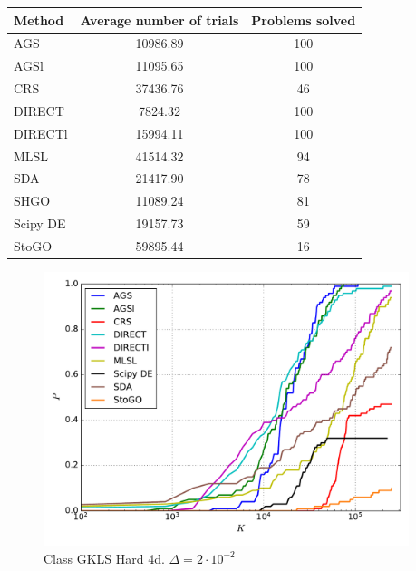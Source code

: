\documentclass[a4paper]{article}
\begin{document}
\begin{tabular}{lcc}
\hline
 Method   &  Average number of trials  &  Problems solved  \\
\hline
 AGS      &          10986.89          &        100        \\
 AGSl     &          11095.65          &        100        \\
 CRS      &          37436.76          &        46         \\
 DIRECT   &          7824.32           &        100        \\
 DIRECTl  &          15994.11          &        100        \\
 MLSL     &          41514.32          &        94         \\
 SDA      &          21417.90          &        78         \\
 SHGO     &          11089.24          &        81         \\
 Scipy DE &          19157.73          &        59         \\
 StoGO    &          59895.44          &        16         \\
\hline
\end{tabular}
\begin{figure}[H]
  \center
  \includegraphics[width=0.95\textwidth]{../experiments/gklsh4d/cmc.pdf}
  \caption{Class GKLS Hard 4d. $\Delta=2\cdot10^{-2}$}
\end{figure}
\end{document}
